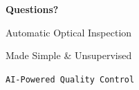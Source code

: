 \documentclass[aspectratio=169, 11pt]{beamer}
\newcommand{\emphred}[1]{\textcolor{secondary}{#1}}
\begin{document}
\begin{frame}
    \centering
    \vspace*{1.5cm}

    {\Huge\bfseries\color{primary} Questions?}

    \vspace{1.5cm}

    \emphred{\large Automatic Optical Inspection}

    \emphred{\large Made Simple \& Unsupervised}

    \vspace{1.5cm}

    {\large \texttt{AI-Powered Quality Control}}
\end{frame}
\end{document}
